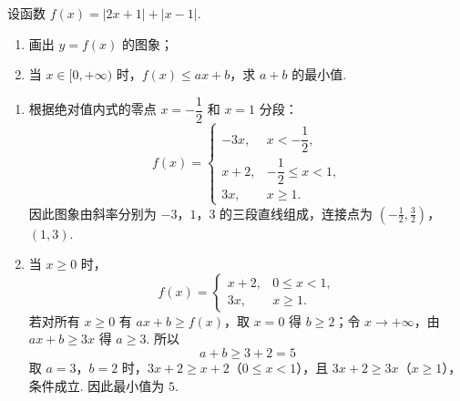\begin{problem}
设函数 \(f(x)=|2x+1|+|x-1|\).

\begin{enumerate}
    \item 画出 \(y=f(x)\) 的图象；
    \item 当 \(x\in[0,+\infty)\) 时，\(f(x)\le ax+b\)，求 \(a+b\) 的最小值.
\end{enumerate}

\end{problem}

\begin{solution}
\begin{enumerate}
    \item 根据绝对值内式的零点 \(x=-\dfrac12\) 和 \(x=1\) 分段：
    \[
    f(x)=\begin{cases}
    -3x,&x< -\dfrac12,\\
    x+2,&-\dfrac12\le x<1,\\
    3x,&x\ge1.
    \end{cases}
    \]
    因此图象由斜率分别为 \(-3\)，\(1\)，\(3\) 的三段直线组成，连接点为
\(\left(-\frac12,\frac32\right)\)，\((1,3)\).
    \item 当 \(x\ge0\) 时，
    \[
    f(x)=\begin{cases}
    x+2,&0\le x<1,\\
    3x,&x\ge1.
    \end{cases}
    \]
    若对所有 \(x\ge0\) 有 \(ax+b\ge f(x)\)，取 \(x=0\) 得 \(b\ge2\)；令 \(x\to+\infty\)，由 \(ax+b\ge3x\) 得 \(a\ge3\). 所以
    \[
    a+b\ge3+2=5
    \]
    取 \(a=3\)，\(b=2\) 时，\(3x+2\ge x+2\)（\(0\le x<1\)），且 \(3x+2\ge3x\)（\(x\ge1\)），条件成立. 因此最小值为 \(5\).
\end{enumerate}
\end{solution}
